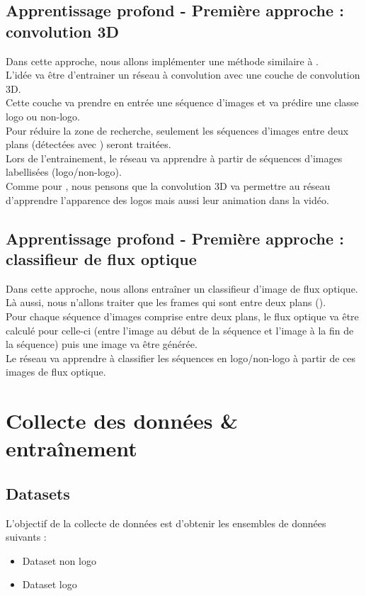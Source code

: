 \documentclass[11pt]{article}
\begin{document}
\subsection{Apprentissage profond - Première approche : convolution 3D}
\label{sec:org81a01a1}
Dans cette approche, nous allons implémenter une méthode similaire à \cite{Tran_2015}.\\
L'idée va être d'entrainer un réseau à convolution avec une couche de convolution 3D.\\
Cette couche va prendre en entrée une séquence d'images et va prédire une classe logo ou non-logo.\\
Pour réduire la zone de recherche, seulement les séquences d'images entre deux plans (détectées avec \cite{Abd_Almageed_2008}) seront traitées.\\
Lors de l'entrainement, le réseau va apprendre à partir de séquences d'images labellisées (logo/non-logo).\\
Comme pour \cite{Tran_2015}, nous pensons que la convolution 3D va permettre au réseau d'apprendre l'apparence des logos mais aussi leur animation dans la vidéo.\\
\subsection{Apprentissage profond - Première approche : classifieur de flux optique}
\label{sec:org50d4243}
Dans cette approche, nous allons entraîner un classifieur d'image de flux optique.\\
Là aussi, nous n'allons traiter que les frames qui sont entre deux plans (\cite{Abd_Almageed_2008}).\\
Pour chaque séquence d'images comprise entre deux plans, le flux optique va être calculé pour celle-ci (entre l'image au début de la séquence et l'image à la fin de la séquence) puis une image va être générée.\\
Le réseau va apprendre à classifier les séquences en logo/non-logo à partir de ces images de flux optique.\\
\newpage
\section{Collecte des données \& entraînement}
\label{sec:org2542446}
\subsection{Datasets}
\label{sec:org531d67a}
L'objectif de la collecte de données est d'obtenir les ensembles de données suivants :\\
\begin{itemize}
\item Dataset non logo\\
\item Dataset logo\\
\end{itemize}
\end{document}
